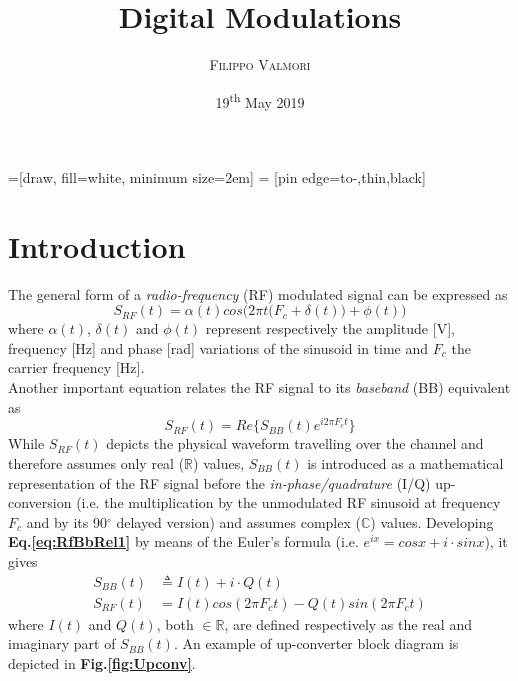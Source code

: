 \documentclass[twoside,twocolumn]{article}
\title{Digital Modulations} %
\author{%
\textsc{Filippo Valmori} \\ %
}
\date{19\textsuperscript{th} May 2019}   %
\begin{document}
=[draw, fill=white, minimum size=2em]
 = [pin edge={to-,thin,black}]


\maketitle


\section{Introduction}
The general form of a \textit{radio-frequency} (RF) modulated signal can be expressed as
\begin{equation} \label{eq:GenRfMod}
S_{\mathit{RF}}(t) = \alpha(t)cos\Big(2\pi t\big(F_c+\delta(t)\big)+\phi(t)\Big)
\end{equation}
 where $\alpha(t)$, $\delta(t)$ and $\phi(t)$ represent respectively the amplitude [V], frequency [Hz] and phase [rad] variations of the sinusoid in time and $F_c$ the carrier frequency [Hz].\\ %
Another important equation relates the RF signal to its \textit{baseband} (BB) equivalent as
\begin{equation} \label{eq:RfBbRel1}
S_{\mathit{RF}}(t) = Re \Big\{ S_{\mathit{BB}}(t)e^{i2\pi F_ct} \Big\}
\end{equation}
While $S_{\mathit{RF}}(t)$ depicts the physical waveform travelling over the channel and therefore assumes only real ($\mathbb{R}$) values, $S_{\mathit{BB}}(t)$ is introduced as a mathematical representation of the RF signal before the \textit{in-phase/quadrature} (I/Q) up-conversion (i.e. the multiplication by the unmodulated RF sinusoid at frequency $F_c$ and by its 90$^\circ$ delayed version) and assumes complex ($\mathbb{C}$) values. Developing \textbf{Eq.\ref{eq:RfBbRel1}} by means of the Euler's formula (i.e. $e^{ix} = cos x+i\cdot sin x$), it gives
\begin{align}
S_{\mathit{BB}}(t) &\triangleq I(t) +i \cdot Q(t) \label{eq:RfBbRel2} \\
S_{\mathit{RF}}(t) &= I(t)cos(2\pi F_ct)-Q(t)sin(2\pi F_ct) \nonumber
\end{align}
where $I(t)$ and $Q(t)$, both $\in \mathbb{R}$, are defined respectively as the real and imaginary part of $S_{\mathit{BB}}(t)$. An example of up-converter block diagram is depicted in \textbf{Fig.\ref{fig:Upconv}}.
\end{document}
